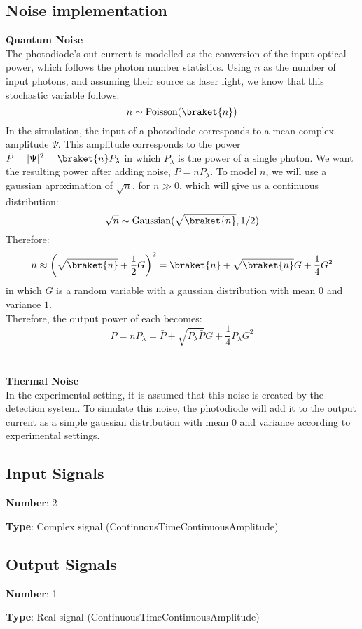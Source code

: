 \documentclass[../../sdf/tex/BPSK_system.tex]{subfiles}
\begin{document}
\subsection*{Noise implementation}

{\bf Quantum Noise}\\
The photodiode's out current is modelled as the conversion of the input optical power, which follows the photon number statistics. Using $n$ as the number of input photons, and assuming their source as laser light, we know that this stochastic variable follows:
%
\begin{equation}
n \sim \textrm{Poisson}(\braket{n})
\end{equation}
%
In the simulation, the input of a photodiode corresponds to a mean complex amplitude $\bar{\Psi}$. This amplitude corresponds to the power $\bar{P} = |\bar{\Psi}|^2 = \braket{n}P_\lambda$ in which $P_\lambda$ is the power of a single photon. We want the resulting power after adding noise, $P = n P_\lambda$. To model $n$, we will use a gaussian aproximation of $\sqrt{n}$, for $n \gg 0$, which will give us a continuous distribution:
%
\begin{equation}
\sqrt{n} \sim \textrm{Gaussian}(\sqrt{\braket{n}}, 1/2)
\end{equation}
%
Therefore:
%
\begin{equation}
n \approx \left( \sqrt{\braket{n}} + \frac{1}{2}G \right)^2 = \braket{n} + \sqrt{\braket{n}} G + \frac{1}{4} G^2
\end{equation}
%
in which $G$ is a random variable with a gaussian distribution with mean $0$ and variance $1$.\\
Therefore, the output power of each becomes:
%
\begin{equation}
P = n P_\lambda = \bar{P} + \sqrt{P_\lambda \bar{P}} G + \frac{1}{4} P_\lambda G^2
\end{equation}
%
\\
\\
{\bf Thermal Noise}\\
In the experimental setting, it is assumed that this noise is created by the detection system. To simulate this noise, the photodiode will add it to the output current as a simple gaussian distribution with mean $0$ and variance according to experimental settings.\\

\subsection*{Input Signals}

\textbf{Number}: 2

\textbf{Type}: Complex signal (ContinuousTimeContinuousAmplitude)

\subsection*{Output Signals}

\textbf{Number}: 1

\textbf{Type}: Real signal (ContinuousTimeContinuousAmplitude)
\end{document}
